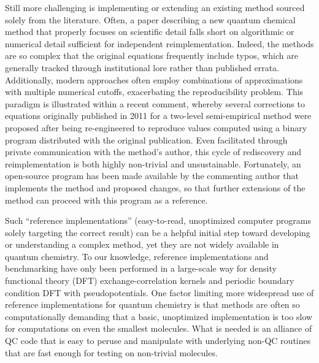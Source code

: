 \documentclass[journal=jctcce,manuscript=article]{achemso}
\begin{document}
Still more challenging is implementing or extending an existing method sourced solely from the literature.  Often, a paper describing a new quantum chemical method that properly focuses on scientific detail falls short on algorithmic or numerical detail sufficient for independent reimplementation. Indeed, the methods are so complex that the original equations frequently include typos, which are generally tracked through institutional lore rather than published errata.  Additionally, modern approaches often employ combinations of approximations with multiple numerical cutoffs, exacerbating the reproducibility problem.  This paradigm is illustrated within a recent comment,\cite{Briling:2017:157101} whereby several corrections to equations originally published in 2011 for a two-level semi-empirical method\cite{Laikov:2011:134120} were proposed after being re-engineered to reproduce values computed using a binary program distributed with the original publication.  Even facilitated through private communication with the method's author, this cycle of rediscovery and reimplementation is both highly non-trivial and unsustainable.  Fortunately, an open-source program\cite{brilingqm} has been made available by the commenting author that implements the method and proposed changes, so that further extensions of the method can proceed with this program as a reference.

Such ``reference implementations'' (easy-to-read, unoptimized computer programs solely targeting the correct result) can be a helpful initial step toward developing or understanding a complex method, yet they are not widely available in quantum chemistry.  To our knowledge, reference implementations and benchmarking have only been performed in a large-scale way for density functional theory (DFT) exchange-correlation kernels\cite{CCL_DFT} and periodic boundary condition DFT with pseudopotentials.\cite{Lejaeghereaad3000} One factor limiting more widespread use of reference implementations for quantum chemistry is that methods are often so computationally demanding that a basic, unoptimized implementation is too slow for computations on even the smallest molecules.  What is needed is an alliance of QC code that is easy to peruse and manipulate with underlying non-QC routines that are fast enough for testing on non-trivial molecules.
\end{document}
